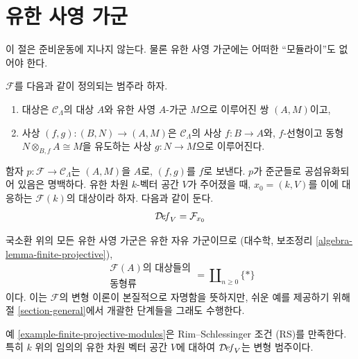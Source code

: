 \section{유한 사영 가군}
\label{section-finite-projective-modules}

\noindent
이 절은 준비운동에 지나지 않는다. 물론 유한 사영 가군에는 어떠한
``모듈라이''도 없어야 한다.

\begin{example}[유한 사영 가군]
\label{example-finite-projective-modules}
$\mathcal{F}$를 다음과 같이 정의되는 범주라 하자.
\begin{enumerate}
\item 대상은 $\mathcal{C}_\Lambda$의 대상 $A$와 유한 사영
$A$-가군 $M$으로 이루어진 쌍 $(A, M)$이고,
\item 사상 $(f, g) : (B, N) \to (A, M)$은
$\mathcal{C}_\Lambda$의 사상 $f : B \to A$와, $f$-선형이고
동형 $N \otimes_{B, f} A \cong M$을 유도하는 사상
$g : N \to M$으로 이루어진다.
\end{enumerate}
함자 $p : \mathcal{F} \to \mathcal{C}_\Lambda$는 $(A, M)$을 $A$로,
$(f, g)$를 $f$로 보낸다. $p$가 준군들로 공섬유화되어 있음은 명백하다.
유한 차원 $k$-벡터 공간 $V$가 주어졌을 때, $x_0 = (k, V)$를 이에
대응하는 $\mathcal{F}(k)$의 대상이라 하자. 다음과 같이 둔다.
$$
\mathcal{D}\!\mathit{ef}_V = \mathcal{F}_{x_0}
$$
\end{example}

\noindent
국소환 위의 모든 유한 사영 가군은 유한 자유 가군이므로
(대수학, 보조정리 \ref{algebra-lemma-finite-projective}),
$$
\begin{matrix}
\mathcal{F}(A)\text{의 대상들의} \\
\text{동형류}
\end{matrix}
= \coprod\nolimits_{n \geq 0} \{*\}
$$
이다. 이는 $\mathcal{F}$의 변형 이론이 본질적으로 자명함을 뜻하지만,
쉬운 예를 제공하기 위해 절 \ref{section-general}에서 개괄한 단계들을
그래도 수행한다.

\begin{lemma}
\label{lemma-finite-projective-modules-RS}
예 \ref{example-finite-projective-modules}은 Rim--Schlessinger 조건
(RS)를 만족한다. 특히 $k$ 위의 임의의 유한 차원 벡터 공간 $V$에 대하여
$\mathcal{D}\!\mathit{ef}_V$는 변형 범주이다.
\end{lemma}

